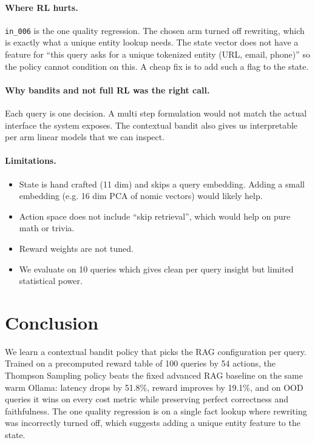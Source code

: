 \documentclass{article}
\begin{document}
\paragraph{Where RL hurts.} \texttt{in\_006} is the one quality regression. The chosen arm turned off rewriting, which is exactly what a unique entity lookup needs. The state vector does not have a feature for ``this query asks for a unique tokenized entity (URL, email, phone)'' so the policy cannot condition on this. A cheap fix is to add such a flag to the state.

\paragraph{Why bandits and not full RL was the right call.} Each query is one decision. A multi step formulation would not match the actual interface the system exposes. The contextual bandit also gives us interpretable per arm linear models that we can inspect.

\paragraph{Limitations.}
\begin{itemize}
    \item State is hand crafted (11 dim) and skips a query embedding. Adding a small embedding (e.g. 16 dim PCA of nomic vectors) would likely help.
    \item Action space does not include ``skip retrieval'', which would help on pure math or trivia.
    \item Reward weights are not tuned.
    \item We evaluate on 10 queries which gives clean per query insight but limited statistical power.
\end{itemize}

\section{Conclusion}

We learn a contextual bandit policy that picks the RAG configuration per query. Trained on a precomputed reward table of 100 queries by 54 actions, the Thompson Sampling policy beats the fixed advanced RAG baseline on the same warm Ollama: latency drops by 51.8\%, reward improves by 19.1\%, and on OOD queries it wins on every cost metric while preserving perfect correctness and faithfulness. The one quality regression is on a single fact lookup where rewriting was incorrectly turned off, which suggests adding a unique entity feature to the state.
\end{document}

